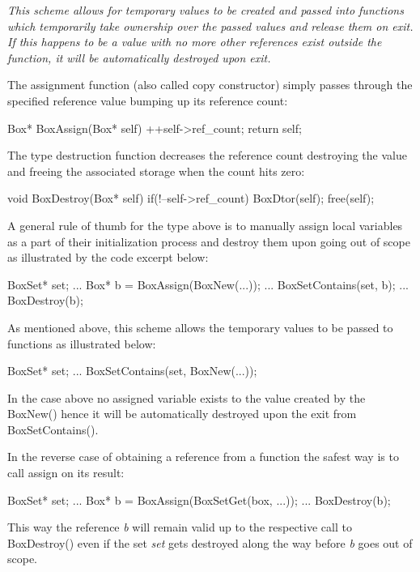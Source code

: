 \documentclass[a4paper]{article}
\newcommand{\meth}[1]{#1}
\begin{document}
\emph{This scheme allows for temporary values to be created and passed into functions which temporarily take ownership over the passed values and release them on exit. If this happens to be a value with no more other references exist outside the function, it will be automatically destroyed upon exit.}


The assignment function (also called copy constructor) simply passes through the specified reference value bumping up its reference count:
\begin{cs}
Box* BoxAssign(Box* self) {
	++self->ref_count;
	return self;
}
\end{cs}


The type destruction function decreases the reference count destroying the value and freeing the associated storage when the count hits zero:


\begin{cs}
void BoxDestroy(Box* self) {
	if(!--self->ref_count) {
		BoxDtor(self);
		free(self);
	}
}
\end{cs}


A general rule of thumb for the type above is to manually assign local variables as a part of their initialization process and destroy them upon going out of scope as illustrated by the code excerpt below:


\begin{cs}
BoxSet* set;
...
{
	Box* b = BoxAssign(BoxNew(...));
	...
	BoxSetContains(set, b);
	...
	BoxDestroy(b);
}
\end{cs}


As mentioned above, this scheme allows the temporary values to be passed to functions as illustrated below:


\begin{cs}
BoxSet* set;
...
BoxSetContains(set, BoxNew(...));
\end{cs}


In the case above no assigned variable exists to the value created by the \meth{BoxNew()} hence it will be automatically destroyed upon the exit from \meth{BoxSetContains()}.


In the reverse case of obtaining a reference from a function the safest way is to call assign on its result:
\begin{cs}
BoxSet* set;
...
{
	Box* b = BoxAssign(BoxSetGet(box, ...));
	...
	BoxDestroy(b);
}
\end{cs}


This way the reference \emph{b} will remain valid up to the respective call to \meth{BoxDestroy()} even if the set \emph{set} gets destroyed along the way before \emph{b} goes out of scope.
\end{document}
